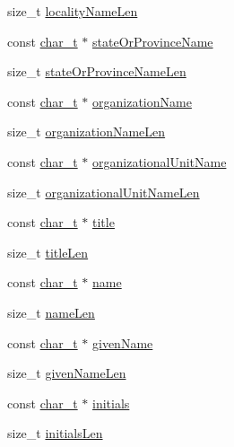 \begin{DoxyCompactItemize}
\item 
size\+\_\+t \hyperlink{structX509Name_aba984d3fdf4e5c6eecb90752e54de3a7}{locality\+Name\+Len}
\item 
const \hyperlink{compiler__port_8h_a40bb5262bf908c328fbcfbe5d29d0201}{char\+\_\+t} $\ast$ \hyperlink{structX509Name_ad7101a1d70be5540fc1246c3819383dd}{state\+Or\+Province\+Name}
\item 
size\+\_\+t \hyperlink{structX509Name_a976a693703efcb68deed5c6294d0c95e}{state\+Or\+Province\+Name\+Len}
\item 
const \hyperlink{compiler__port_8h_a40bb5262bf908c328fbcfbe5d29d0201}{char\+\_\+t} $\ast$ \hyperlink{structX509Name_a521dfa010d25113b7ebca412a8ef1b6b}{organization\+Name}
\item 
size\+\_\+t \hyperlink{structX509Name_af2841192675d2bd0f999533a723d1c1d}{organization\+Name\+Len}
\item 
const \hyperlink{compiler__port_8h_a40bb5262bf908c328fbcfbe5d29d0201}{char\+\_\+t} $\ast$ \hyperlink{structX509Name_a4095d2020e8553687a85b462fd00eac9}{organizational\+Unit\+Name}
\item 
size\+\_\+t \hyperlink{structX509Name_a17dc575cf29d256e44331bcb05ea67f0}{organizational\+Unit\+Name\+Len}
\item 
const \hyperlink{compiler__port_8h_a40bb5262bf908c328fbcfbe5d29d0201}{char\+\_\+t} $\ast$ \hyperlink{structX509Name_a5d2ae5a4848f91eccefbeabc69820652}{title}
\item 
size\+\_\+t \hyperlink{structX509Name_a0058184d7e0354caeac1e7fdad588b83}{title\+Len}
\item 
const \hyperlink{compiler__port_8h_a40bb5262bf908c328fbcfbe5d29d0201}{char\+\_\+t} $\ast$ \hyperlink{structX509Name_a394c9f9f73684a428aae25966b8ba4ca}{name}
\item 
size\+\_\+t \hyperlink{structX509Name_a7dbc2e822775eadb3fd3954acdc6f73c}{name\+Len}
\item 
const \hyperlink{compiler__port_8h_a40bb5262bf908c328fbcfbe5d29d0201}{char\+\_\+t} $\ast$ \hyperlink{structX509Name_a17920a6ac4d8f5861eb94d449de21338}{given\+Name}
\item 
size\+\_\+t \hyperlink{structX509Name_aacfef579b78cdecc4e865d3a59dc5901}{given\+Name\+Len}
\item 
const \hyperlink{compiler__port_8h_a40bb5262bf908c328fbcfbe5d29d0201}{char\+\_\+t} $\ast$ \hyperlink{structX509Name_a4b7ee284208fc072beb26bd1ab2d8297}{initials}
\item 
size\+\_\+t \hyperlink{structX509Name_a2b7b4d29b65c03212c5b2fb3d94c1ab1}{initials\+Len}

\end{DoxyCompactItemize}
